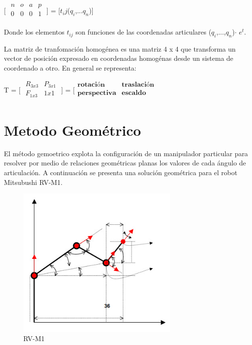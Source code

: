 \documentclass[letter,openright,12pt,spanish]{report}
\begin{document}
\begin{center}
[
$\begin{matrix}
	n & o & a & p\\
	0 & 0 & 0 & 1\\
\end{matrix}$ ] = [$t_ij$($q_i$,...$q_n$)]
\end{center}

Donde los elementos $t_{ij}$ son funciones de las coordenadas articulares ($q_i$,...,$q_n$)$\cdot $ $e^t$.

La matriz de tranfomaci\'on homog\'enea es una matriz 4 x 4 que transforma un vector de posici\'on expresado en coordenadas homog\'enas desde un sistema de coordenado a otro. En general se representa:

\begin{center}
T = [ $\begin{matrix}
	R_{3x3} & P_{3x1}\\
	F_{1x3} & 1x1\\
\end{matrix}$ ] = [$\begin{matrix}
	\textbf{rotaci\'on} & \textbf{traslaci\'on}\\
	\textbf{perspectiva} & \textbf{escaldo}\\
\end{matrix}$
\end{center}

\section{Metodo Geom\'etrico}

El m\'etodo gemoetrico explota la configuraci\'on de un manipulador particular para resolver por medio de relaciones geom\'etricas planas los valores de cada \'angulo de articulaci\'on. A continuaci\'on se presenta una soluci\'on geom\'etrica para el robot Mitsubushi RV-M1.

\begin{figure}[htp]
\centering
\includegraphics[width=8cm]{1.jpg}
\caption{RV-M1}
\label{Figura 1}
\end{figure}
\end{document}
